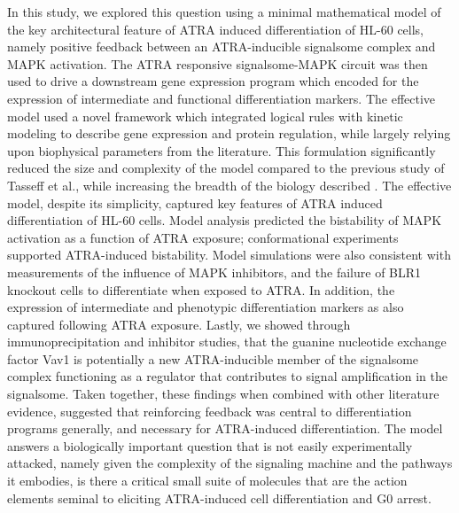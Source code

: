 \documentclass[12pt]{article}
\begin{document}
In this study, we explored this question using a minimal mathematical model of the key architectural feature of ATRA induced differentiation of HL-60 cells,
namely positive feedback between an ATRA-inducible signalsome complex and MAPK activation.
The ATRA responsive signalsome-MAPK circuit was then used to drive a downstream gene expression program which encoded for the expression of intermediate and functional differentiation markers.
The effective model used a novel framework which integrated logical rules with kinetic modeling to describe gene expression and protein regulation,
while largely relying upon biophysical parameters from the literature.
This formulation significantly reduced the size and complexity of the model compared to the previous study of Tasseff et al., while increasing the breadth of the biology described \cite{Tasseff2011}.
The effective model, despite its simplicity, captured key features of ATRA induced differentiation of HL-60 cells.
Model analysis predicted the bistability of MAPK activation as a function of ATRA exposure; conformational experiments supported ATRA-induced bistability.
Model simulations were also consistent with measurements of the influence of MAPK inhibitors, and the failure of BLR1 knockout cells to differentiate when exposed to ATRA.
In addition, the expression of intermediate and phenotypic differentiation markers as also captured following ATRA exposure.
Lastly, we showed through immunoprecipitation and inhibitor studies,
that the guanine nucleotide exchange factor Vav1 is potentially a new ATRA-inducible member of the signalsome complex functioning as a regulator that contributes to signal amplification in the signalsome.
Taken together, these findings when combined with other literature evidence,
suggested that reinforcing feedback was central to differentiation programs generally, and necessary for ATRA-induced differentiation.
The model answers a biologically important question that is not easily experimentally attacked, namely given the complexity of the signaling machine and the pathways it embodies, is there a critical small suite of molecules that are the action elements seminal to eliciting ATRA-induced cell differentiation and G0 arrest.

\end{document}
